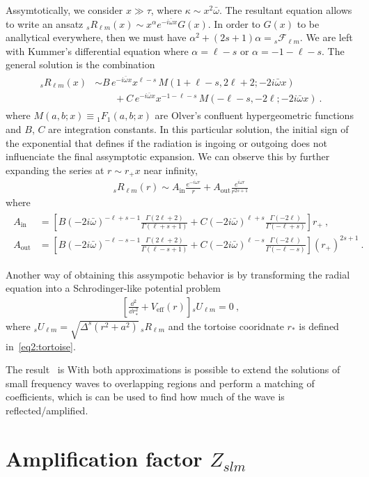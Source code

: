 Assymtotically, we consider $x\gg\tau$, where $\kappa\sim x^2 \bar{\omega}$. The resultant equation allows to write an ansatz ${}_{s}R_{\ell m}(x)\sim x^\alpha e^{- i \bar{\omega} x} G(x)$. In order to $G(x)$ to be anallytical everywhere, then we must have $\alpha^2+(2s+1)\alpha = {}_{s}\mathscr{F}_{\ell m}$. We are left with Kummer's differential equation where $\alpha = \ell-s$ or $\alpha=-1-\ell-s$. The general solution is the combination
\begin{align}
    \begin{split}
    {}_{s}R_{\ell m}(x) &\sim   B\,  e^{-i \bar{\omega} x} x^{\ell-s} \, M(1+\ell-s, 2 \ell+2 ; -2 i \bar{\omega} x) \\
    &\qquad + C\,  e^{-i \bar{\omega} x} x^{-1-\ell-s} \, M(-\ell-s, -2 \ell ; -2 i \bar{\omega} x) ~.
    \end{split}
\end{align}
where $M(a,b;x)\equiv {}_{1}F_1(a,b;x)$ are Olver's confluent hypergeometric functions and $B$, $C$ are integration constants.
In this particular solution, the initial sign of the exponential that defines if the radiation is ingoing or outgoing does not influenciate the final assymptotic expansion. We can observe this by further expanding the series at $r \sim r_{+} x$ near infinity,
\begin{align}
    {}_{s}R_{\ell m}(r) \sim A_\mathrm{in} \frac{e^{-i \omega r}}{r} + A_\mathrm{out} \frac{e^{i \omega r}}{r^{2s+1}}
    \label{eq3:assymptoticR}
\end{align}
where
\begin{align}
    \begin{split}
    A_\mathrm{in} &= \left[ B (-2 i \bar{\omega})^{-\ell+s-1} \frac{\Gamma(2\ell+2)}{\Gamma(\ell+s+1)} + C (-2 i \bar{\omega})^{\ell+s} \frac{\Gamma(-2\ell)}{\Gamma(-\ell+s)} \right] r_{+} ~, \\
    A_\mathrm{out} &= \left[ B (-2 i \bar{\omega})^{-\ell-s-1} \frac{\Gamma(2\ell+2)}{\Gamma(\ell-s+1)} + C (-2 i \bar{\omega})^{\ell-s} \frac{\Gamma(-2\ell)}{\Gamma(-\ell-s)} \right] (r_{+})^{2s+1}  ~.
    \end{split}
\end{align}

Another way of obtaining this assympotic behavior is by transforming the radial equation into a Schrodinger-like potential problem
\begin{align}
    \left[ \frac{\dd^2}{\dd r_{*}^2} + V_\mathrm{eff}(r) \right] {}_{s}U_{\ell m} = 0 ~,
\end{align}
where ${}_{s}U_{\ell m}=\sqrt{\Delta^s (r^2 + a^2)} \,{}_{s}R_{\ell m}$ and the tortoise cooridnate $r_*$ is defined in~\eqref{eq2:tortoise}.


The result~ is 
With both approximations is possible to extend the solutions of small frequency waves to overlapping regions and perform a matching of coefficients, which is can be used to find how much of the wave is reflected/amplified. 


\section{Amplification factor $Z_{slm}$}


\cleardoublepage